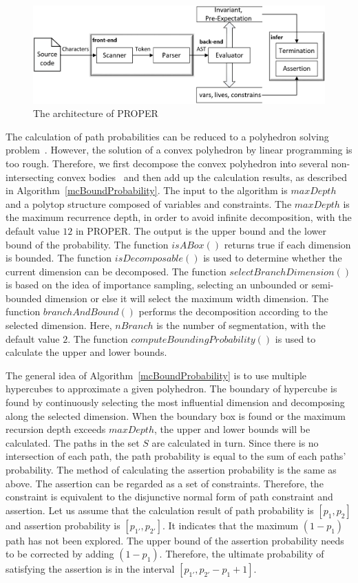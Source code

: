 \documentclass[conference]{IEEEtran}
\begin{document}
\begin{figure}[htbp]
	\centering
	\includegraphics[scale=0.6]{img/architecture}
	\caption{The architecture of PROPER}
	\label{architecture}
\end{figure}

The calculation of path probabilities can be reduced to a polyhedron solving problem~\cite{Visser2012Green}. However, the solution of a convex polyhedron by linear programming is too rough. Therefore, we first decompose the convex polyhedron into several non-intersecting convex bodies~\cite{Bingsheng2020} and then add up the calculation results, as described in Algorithm~\ref{mcBoundProbability}. The input to the algorithm is $maxDepth$ and a polytop structure composed of variables and constraints. The $maxDepth$ is the maximum recurrence depth, in order to avoid infinite decomposition, with the default value $12$ in PROPER. The output is the upper bound and the lower bound of the probability. The function $isABox()$ returns true if each dimension is bounded. The function $isDecomposable()$ is used to determine whether the current dimension can be decomposed. The function $selectBranchDimension()$ is based on the idea of importance sampling, selecting an unbounded or semi-bounded dimension or else it will select the maximum width dimension. The function $branchAndBound()$  performs the decomposition according to the selected dimension. Here, $nBranch$ is the number of segmentation, with the default value $2$. The function $computeBoundingProbability()$ is used to calculate the upper and lower bounds. 

The general idea of Algorithm~\ref{mcBoundProbability} is to use multiple hypercubes to approximate a given polyhedron. The boundary of hypercube is found by continuously selecting the most influential dimension and decomposing along the selected dimension. When the boundary box is found or the maximum recursion depth exceeds $maxDepth$, the upper and lower bounds will be calculated.
The paths in the set $S$ are calculated in turn. Since there is no intersection of each path, the path probability is equal to the sum of each paths' probability. The method of calculating the assertion probability is the same as above. The assertion can be regarded as a set of constraints. Therefore, the constraint is equivalent to the disjunctive normal form of path constraint and assertion.
Let us assume that the calculation result of path probability is $[p_1,p_2]$ and assertion probability is $[p_{1'},p_{2'}]$. It indicates that the maximum $(1-p_1)$ path has not been explored. The upper bound of the assertion probability needs to be corrected by adding $(1-p_1)$. Therefore, the ultimate probability of satisfying the assertion is in the interval $[p_{1'},p_{2'}-p_1+1]$.
\end{document}

